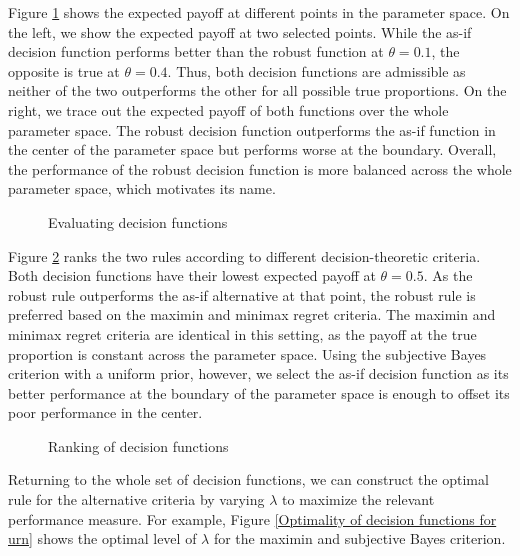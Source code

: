 Figure \ref{Measurement of performance} shows the expected payoff at different points in the parameter space. On the left, we show the expected payoff at two selected points. While the as-if decision function performs better than the robust function at $\theta = 0.1$, the opposite is true at $\theta = 0.4$. Thus, both decision functions are admissible as neither of the two outperforms the other for all possible true proportions. On the right, we trace out the expected payoff of both functions over the whole parameter space. The robust decision function outperforms the as-if function in the center of the parameter space but performs worse at the boundary. Overall, the performance of the robust decision function is more balanced across the whole parameter space, which motivates its name.

\begin{figure}[h!]\centering
{}\hspace{0.3cm}
\caption{Evaluating decision functions}\label{Measurement of performance}
\end{figure}\FloatBarrier

Figure \ref{Ranking of decision functions} ranks the two rules according to different decision-theoretic criteria. Both decision functions have their lowest expected payoff at $\theta = 0.5$. As the robust rule outperforms the as-if alternative at that point, the robust rule is preferred based on the maximin and minimax regret criteria. The maximin and minimax regret criteria are identical in this setting, as the payoff at the true proportion is constant across the parameter space.   Using the subjective Bayes criterion with a uniform prior, however, we select the as-if decision function as its better performance at the boundary of the parameter space is enough to offset its poor performance in the center.

\begin{figure}[h!]\centering
{}
\caption{Ranking of decision functions}\label{Ranking of decision functions}
\end{figure}\FloatBarrier

Returning to the whole set of decision functions, we can construct the optimal rule for the alternative criteria by varying $\lambda$ to maximize the relevant performance measure. For example, Figure \ref{Optimality of decision functions for urn} shows the optimal level of $\lambda$ for the maximin and subjective Bayes criterion.

